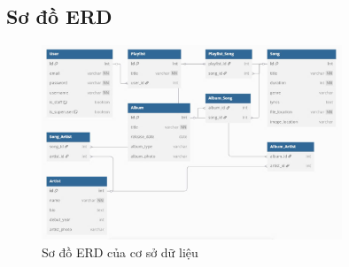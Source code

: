 \subsection{Sơ đồ ERD}
\begin{figure}[h]
    \centering
    \includegraphics[width=0.8\textwidth]{imgs/erd.jpg}
    \caption{Sơ đồ ERD của cơ sở dữ liệu}
\end{figure}
